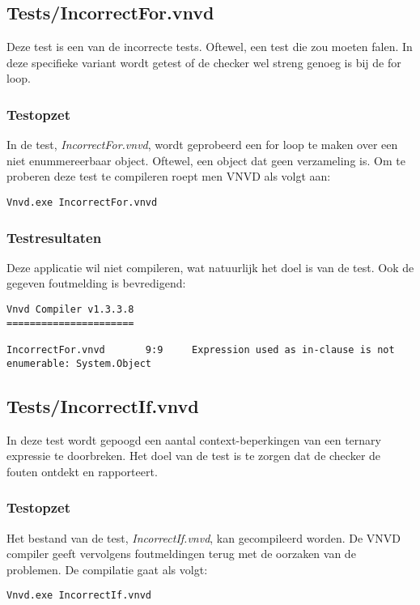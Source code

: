 \subsection{Tests/IncorrectFor.vnvd}
Deze test is een van de incorrecte tests. Oftewel, een test die zou moeten falen. In deze specifieke variant wordt getest of de checker wel streng genoeg is bij de for loop.

\subsubsection{Testopzet}
In de test, \textit{IncorrectFor.vnvd}, wordt geprobeerd een for loop te maken over een niet enummereerbaar object. Oftewel, een object dat geen verzameling is. Om te proberen deze test te compileren roept men VNVD als volgt aan:

\begin{lstlisting}
Vnvd.exe IncorrectFor.vnvd
\end{lstlisting}

\subsubsection{Testresultaten}
Deze applicatie wil niet compileren, wat natuurlijk het doel is van de test. Ook de gegeven foutmelding is bevredigend:

\begin{lstlisting}
Vnvd Compiler v1.3.3.8
======================

IncorrectFor.vnvd       9:9     Expression used as in-clause is not enumerable: System.Object
\end{lstlisting}

\subsection{Tests/IncorrectIf.vnvd}
In deze test wordt gepoogd een aantal context-beperkingen van een ternary expressie te doorbreken. Het doel van de test is te zorgen dat de checker de fouten ontdekt en rapporteert.

\subsubsection{Testopzet}
Het bestand van de test, \textit{IncorrectIf.vnvd}, kan gecompileerd worden. De VNVD compiler geeft vervolgens foutmeldingen terug met de oorzaken van de problemen. De compilatie gaat als volgt:

\begin{lstlisting}
Vnvd.exe IncorrectIf.vnvd
\end{lstlisting}

